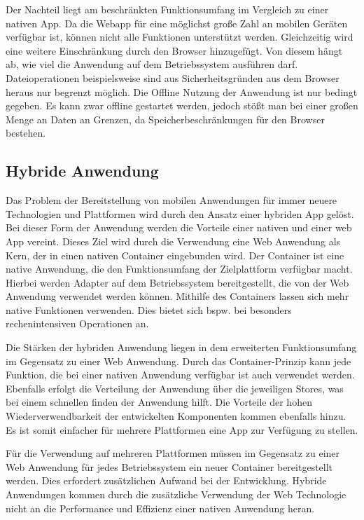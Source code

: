 Der Nachteil liegt am beschränkten Funktionsumfang im Vergleich zu einer nativen App. Da die Webapp für eine möglichst große Zahl an mobilen Geräten verfügbar ist, können nicht alle Funktionen unterstützt werden. Gleichzeitig wird eine weitere Einschränkung durch den Browser hinzugefügt. Von diesem hängt ab, wie viel die Anwendung auf dem Betriebssystem ausführen darf. Dateioperationen beispielsweise sind aus Sicherheitsgründen aus dem Browser heraus nur begrenzt möglich. Die Offline Nutzung der Anwendung ist nur bedingt gegeben. Es kann zwar offline gestartet werden, jedoch stößt man bei einer großen Menge an Daten an Grenzen, da Speicherbeschränkungen für den Browser bestehen.

\subsection{Hybride Anwendung} \label{hybridApplication}
Das Problem der Bereitstellung von mobilen Anwendungen für immer neuere Technologien und Plattformen wird durch den Ansatz einer hybriden App gelöst. Bei dieser Form der Anwendung werden die Vorteile einer nativen und einer web App vereint.  Dieses Ziel wird durch die Verwendung eine Web Anwendung als Kern, der in einen nativen Container eingebunden wird. Der Container ist eine native Anwendung, die den Funktionsumfang der Zielplattform verfügbar macht. Hierbei werden Adapter auf dem Betriebssystem bereitgestellt, die von der Web Anwendung verwendet werden können. Mithilfe des Containers lassen sich mehr native Funktionen verwenden. Dies bietet sich bspw. bei besonders rechenintensiven Operationen an.\par

Die Stärken der hybriden Anwendung liegen in dem erweiterten Funktionsumfang im Gegensatz zu einer Web Anwendung. Durch das Container-Prinzip kann jede Funktion, die bei einer nativen Anwendung verfügbar ist auch verwendet werden. Ebenfalls erfolgt die Verteilung der Anwendung über die jeweiligen Stores, was bei einem schnellen finden der Anwendung hilft. Die Vorteile der hohen Wiederverwendbarkeit der entwickelten Komponenten kommen ebenfalls hinzu. Es ist somit einfacher für mehrere Plattformen eine App zur Verfügung zu stellen. \par

Für die Verwendung auf mehreren Plattformen müssen im Gegensatz zu einer Web Anwendung für jedes Betriebssystem ein neuer Container bereitgestellt werden. Dies erfordert zusätzlichen Aufwand bei der Entwicklung. Hybride Anwendungen kommen durch die zusätzliche Verwendung der Web Technologie nicht an die Performance und Effizienz einer nativen Anwendung heran. 

